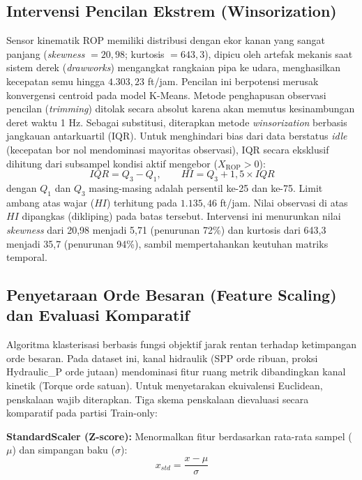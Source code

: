 \documentclass[conference]{IEEEtran}
\begin{document}
\subsection{Intervensi Pencilan Ekstrem (Winsorization)}
Sensor kinematik ROP memiliki distribusi dengan ekor kanan yang sangat panjang (\textit{skewness} $= 20{,}98$; kurtosis $= 643{,}3$), dipicu oleh artefak mekanis saat sistem derek (\textit{drawworks}) mengangkat rangkaian pipa ke udara, menghasilkan kecepatan semu hingga $4.303{,}23$ ft/jam. Pencilan ini berpotensi merusak konvergensi centroid pada model K-Means. Metode penghapusan observasi pencilan (\textit{trimming}) ditolak secara absolut karena akan memutus kesinambungan deret waktu 1 Hz. Sebagai substitusi, diterapkan metode \textit{winsorization} berbasis jangkauan antarkuartil (IQR). Untuk menghindari bias dari data berstatus \textit{idle} (kecepatan bor nol mendominasi mayoritas observasi), IQR secara eksklusif dihitung dari subsampel kondisi aktif mengebor ($X_{\text{ROP}} > 0$):
\begin{equation}
IQR = Q_3 - Q_1, \qquad HI = Q_3 + 1{,}5 \times IQR
\end{equation}
dengan $Q_1$ dan $Q_3$ masing-masing adalah persentil ke-25 dan ke-75. Limit ambang atas wajar ($HI$) terhitung pada $1.135{,}46$ ft/jam. Nilai observasi di atas $HI$ dipangkas (dikliping) pada batas tersebut. Intervensi ini menurunkan nilai \textit{skewness} dari 20,98 menjadi 5,71 (penurunan 72\%) dan kurtosis dari 643,3 menjadi 35,7 (penurunan 94\%), sambil mempertahankan keutuhan matriks temporal.

\subsection{Penyetaraan Orde Besaran (Feature Scaling) dan Evaluasi Komparatif}
Algoritma klasterisasi berbasis fungsi objektif jarak rentan terhadap ketimpangan orde besaran. Pada dataset ini, kanal hidraulik (SPP orde ribuan, proksi Hydraulic\_P orde jutaan) mendominasi fitur ruang metrik dibandingkan kanal kinetik (Torque orde satuan). Untuk menyetarakan ekuivalensi Euclidean, penskalaan wajib diterapkan. Tiga skema penskalaan dievaluasi secara komparatif pada partisi Train-only:

\textbf{StandardScaler (Z-score):} Menormalkan fitur berdasarkan rata-rata sampel ($\mu$) dan simpangan baku ($\sigma$):
\begin{equation}
x_{std} = \frac{x - \mu}{\sigma}
\end{equation}
\end{document}
